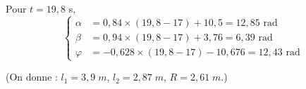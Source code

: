 \ifprof
\begin{corrige}

Pour $t=19,8$ s,
$$
\left\{
\begin{array}{ll}
\alpha&=0,84 \times (19,8-17) + 10,5=\boxed{12,85\text{ rad}}\\
\beta&=0,94\times (19,8-17) +3,76 = \boxed{6,39\text{ rad}}\\
\varphi &= -0,628\times (19,8-17) -10,676 =\boxed{12,43\text{ rad}}
\end{array}
\right.$$
\end{corrige}\else\fi

 (On donne : $l_1=3,9\;m$, $l_2=2,87\;m$, $R=2,61\;m$.)
\ifprof
